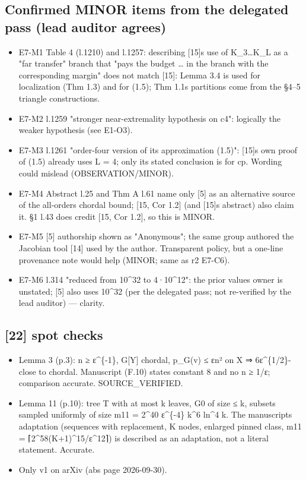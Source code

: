 \documentclass[
]{article}
\providecommand{\tightlist}{%
  \setlength{\itemsep}{0pt}\setlength{\parskip}{0pt}}
\begin{document}
\subsection{Confirmed MINOR items from the delegated pass (lead auditor
agrees)}\label{confirmed-minor-items-from-the-delegated-pass-lead-auditor-agrees}

\begin{itemize}
\tightlist
\item
  E7-M1 Table 4 (l.1210) and l.1257: describing
  {[}15{]}\textquotesingle s use of K\_3\ldots K\_L as a "far transfer"
  branch that "pays the budget \ldots{} in the branch with the
  corresponding margin" does not match {[}15{]}: Lemma 3.4 is used for
  localization (Thm 1.3) and for (1.5); Thm 1.1\textquotesingle s
  partitions come from the §4--5 triangle constructions.
\item
  E7-M2 l.1259 "stronger near-extremality hypothesis on c4": logically
  the weaker hypothesis (see E1-O3).
\item
  E7-M3 l.1261 "order-four version of its approximation (1.5)":
  {[}15{]}\textquotesingle s own proof of (1.5) already uses L = 4; only
  its stated conclusion is for cp. Wording could mislead
  (OBSERVATION/MINOR).
\item
  E7-M4 Abstract l.25 and Thm A l.61 name only {[}5{]} as an alternative
  source of the all-orders chordal bound; {[}15, Cor 1.2{]} (and
  {[}15{]}\textquotesingle s abstract) also claim it. §1 l.43 does
  credit {[}15, Cor 1.2{]}, so this is MINOR.
\item
  E7-M5 {[}5{]} authorship shown as "Anonymous"; the same group authored
  the Jacobian tool {[}14{]} used by the author. Transparent policy, but
  a one-line provenance note would help (MINOR; same as r2 E7-C6).
\item
  E7-M6 l.314 "reduced from 10\^{}32 to 4·10\^{}12": the prior
  value\textquotesingle s owner is unstated; {[}5{]} also uses 10\^{}32
  (per the delegated pass; not re-verified by the lead auditor) ---
  clarity.
\end{itemize}

\subsection{{[}22{]} spot checks}\label{22-spot-checks}

\begin{itemize}
\tightlist
\item
  Lemma 3 (p.3): n ≥ ε\^{}\{-1\}, G{[}Y{]} chordal, p\_G(v) ≤ εn² on X ⇒
  6ε\^{}\{1/2\}-close to chordal. Manuscript (F.10) states constant 8
  and no n ≥ 1/ε; comparison accurate. SOURCE\_VERIFIED.
\item
  Lemma 11 (p.10): tree T with at most k leaves, G0 of size ≤ k, subsets
  sampled uniformly of size m11 = 2\^{}40 ε\^{}\{-4\} k\^{}6 ln\^{}4 k.
  The manuscript\textquotesingle s adaptation (sequences with
  replacement, K nodes, enlarged pinned class, m11 =
  ⌈2\^{}58(K+1)\^{}15/ε\^{}12⌉) is described as an adaptation, not a
  literal statement. Accurate.
\item
  Only v1 on arXiv (abs page 2026-09-30).
\end{itemize}
\end{document}

